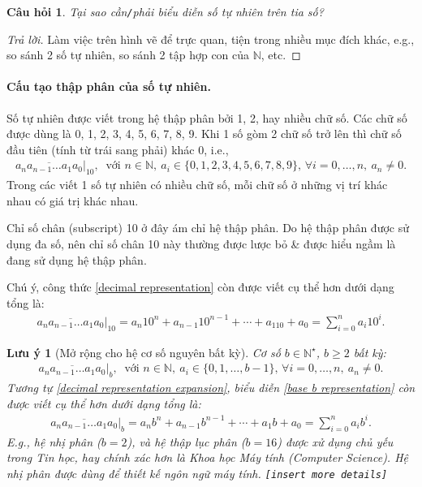 \documentclass{article}
\numberwithin{equation}{section}
\newtheorem{remark}{Lưu ý}[section]
\newtheorem{question}{Câu hỏi}[section]
\begin{document}
\begin{question}
	Tại sao cần\emph{\texttt{/}}phải biểu diễn số tự nhiên trên tia số?
\end{question}

\begin{proof}[Trả lời]
	Làm việc trên hình vẽ để trực quan, tiện trong nhiều mục đích khác, e.g., so sánh 2 số tự nhiên, so sánh 2 tập hợp con của $\mathbb{N}$, etc.
\end{proof}

\paragraph{Cấu tạo thập phân của số tự nhiên.} Số tự nhiên được viết trong hệ thập phân bởi 1, 2, hay nhiều chữ số. Các chữ số được dùng là 0, 1, 2, 3, 4, 5, 6, 7, 8, 9. Khi 1 số gòm 2 chữ số trở lên thì chữ số đầu tiên (tính từ trái sang phải) khác 0, i.e.,
\begin{align}
	\label{decimal representation}
	\overline{a_na_{n-1}\ldots a_1a_0}|_{10},\ \mbox{ với } n\in\mathbb{N},\ a_i\in\{0,1,2,3,4,5,6,7,8,9\},\,\forall i = 0,\ldots,n,\ a_n\ne 0.
\end{align}
Trong các viết 1 số tự nhiên có nhiều chữ số, mỗi chữ số ở những vị trí khác nhau có giá trị khác nhau.

Chỉ số chân (subscript) 10 ở đây ám chỉ hệ thập phân. Do hệ thập phân được sử dụng đa số, nên chỉ số chân 10 này thường được lược bỏ \& được hiểu ngầm là đang sử dụng hệ thập phân.

Chú ý, công thức \eqref{decimal representation} còn được viết cụ thể hơn dưới dạng tổng là:
\begin{align}
	\label{decimal representation expansion}
	\overline{a_na_{n-1}\ldots a_1a_0}|_{10} = a_n10^n + a_{n-1}10^{n-1} + \cdots + a_110 + a_0 = \sum_{i=0}^n a_i10^i.
\end{align}

\begin{remark}[Mở rộng cho hệ cơ số nguyên bất kỳ]
	Cơ số $b\in\mathbb{N}^\star$, $b\ge 2$ bất kỳ:
	\begin{align}
		\label{base b representation}
		\overline{a_na_{n-1}\ldots a_1a_0}|_{b},\ \mbox{ với } n\in\mathbb{N},\ a_i\in\{0,1,\ldots,b - 1\},\,\forall i = 0,\ldots,n,\ a_n\ne 0.
	\end{align}
	Tương tự \eqref{decimal representation expansion}, biểu diễn \eqref{base b representation} còn được viết cụ thể hơn dưới dạng tổng là:
	\begin{align}
		\label{base b representation expansion}
		\overline{a_na_{n-1}\ldots a_1a_0}|_{b} = a_nb^n + a_{n-1}b^{n-1} + \cdots + a_1b + a_0 = \sum_{i=0}^n a_ib^i.
	\end{align}
	E.g., hệ nhị phân ($b = 2$), và hệ thập lục phân ($b = 16$) được xử dụng chủ yếu trong Tin học, hay chính xác hơn là Khoa học Máy tính (Computer Science). Hệ nhị phân được dùng để thiết kế ngôn ngữ máy tính. \texttt{[insert more details]}
\end{remark}
\end{document}
